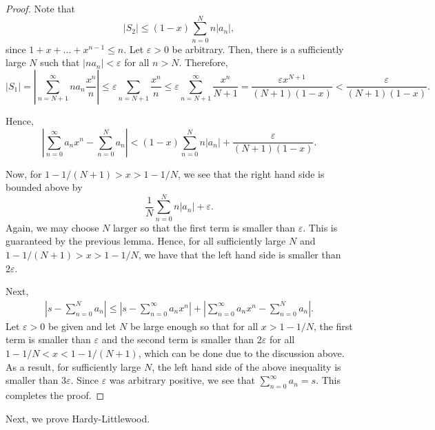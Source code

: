 \documentclass[12pt]{amsart}
\begin{document}
\begin{enumerate}[label=(\alph*)]
\begin{proof}
	Note that 
	\begin{equation*}
		|S_2|\le (1 - x)\sum_{n = 0}^N n|a_n|,
	\end{equation*}
	since $1 + x + \dots + x^{n - 1}\le n$. Let $\varepsilon > 0$ be arbitrary. Then, there is a sufficiently large $N$ such that $|na_n| < \varepsilon$ for all $n > N$. Therefore, 
	\begin{equation*}
		|S_1| = \left|\sum_{n = N + 1}^\infty na_n\frac{x^n}{n}\right|\le\varepsilon\sum_{n = N + 1}\frac{x^n}{n}\le\varepsilon\sum_{n = N + 1}^\infty\frac{x^n}{N + 1} = \frac{\varepsilon x^{N + 1}}{(N + 1)(1 - x)} < \frac{\varepsilon}{(N + 1)(1 - x)}.
	\end{equation*}

	Hence, 
	\begin{equation*}
		\left|\sum_{n = 0}^\infty a_nx^n - \sum_{n = 0}^N a_n\right| < (1 - x)\sum_{n = 0}^N n|a_n| + \frac{\varepsilon}{(N + 1)(1 - x)}.
	\end{equation*}

	Now, for $1 - 1/(N + 1) > x > 1 - 1/N$, we see that the right hand side is bounded above by 
	\begin{equation*}
		\frac{1}{N}\sum_{n = 0}^N n|a_n| + \varepsilon.
	\end{equation*}
	Again, we may choose $N$ larger so that the first term is smaller than $\varepsilon$. This is guaranteed by the previous lemma. Hence, for all sufficiently large $N$ and $1 - 1/(N + 1) > x > 1 - 1/N$, we have that the left hand side is smaller than $2\varepsilon$.

	Next, 
	\begin{align*}
		\left|s - \sum_{n = 0}^N a_n\right| \le \left|s - \sum_{n = 0}^\infty a_nx^n\right| + \left|\sum_{n = 0}^\infty a_nx^n - \sum_{n = 0}^N a_n\right|.
	\end{align*}
	Let $\varepsilon > 0$ be given and let $N$ be large enough so that for all $x > 1 - 1/N$, the first term is smaller than $\varepsilon$ and the second term is smaller than $2\varepsilon$ for all $1 - 1/N < x < 1 - 1/(N + 1)$, which can be done due to the discussion above. As a result, for sufficiently large $N$, the left hand side of the above inequality is smaller than $3\varepsilon$. Since $\varepsilon$ was arbitrary positive, we see that $\sum_{n = 0}^\infty a_n = s$. This completes the proof.
\end{proof}

Next, we prove Hardy-Littlewood. 


\end{enumerate}
\end{document}
